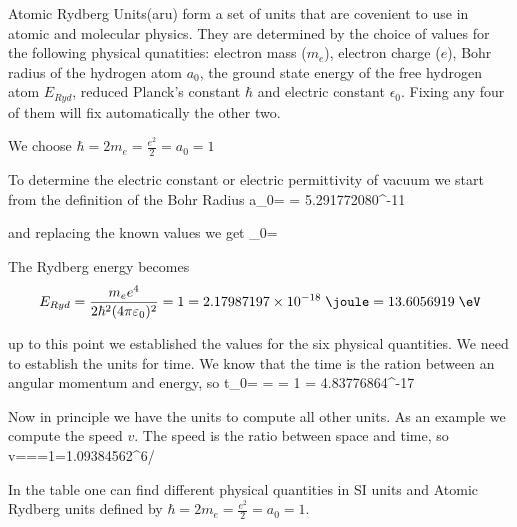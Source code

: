 \par{Atomic Rydberg Units(aru) form a set of units that are covenient to use in atomic and molecular physics. They are determined by the choice of values for the following physical qunatities: electron mass ($m_e$), electron charge ($e$), Bohr radius of the hydrogen atom $a_0$, the ground state energy of the free hydrogen atom $E_{Ryd}$, reduced Planck's constant $\hbar$ and electric constant $\epsilon_0$. Fixing any four of them will fix automatically the other two.}
\par{We choose $\hbar=2m_e=\frac{e^2}{2}=a_0=1$}
\par{To determine the electric constant or electric permittivity of vacuum we start from the definition of the Bohr Radius}
\be
a_0= = 5.291772080^{-11}\;\metre
\ee
\par{and replacing the known values we get}
\be
\varepsilon_0=
\ee
\par{The Rydberg energy becomes}
\begin{equation}
E_{Ryd}=\frac{m_ee^4}{2\hbar^2(4\pi\varepsilon_0)^2} = 1 = 2.17987197\times10^{-18}\;\joule = 13.6056919\;\eV
\end{equation}
\par{up to this point we established the values for the six physical quantities. We need to establish the units for time. We know that the time is the ration between an angular momentum and energy, so}
\be
t_0= =  = 1 = 4.83776864^{-17}\;\second
\ee
\par{Now in principle we have the units to compute all other units. As an example we compute the speed $v$. The speed is the ratio between space and time, so}
\be
v===1=1.09384562^{6}\;\metre/\second
\ee
\par{In the table } one can find different physical quantities in SI units and Atomic Rydberg units defined by $\hbar=2m_e=\frac{e^2}{2}=a_0=1$.
